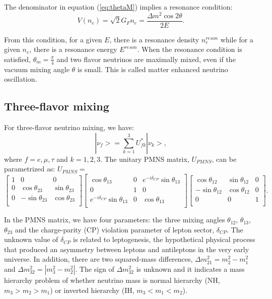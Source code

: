 \documentclass[preprint,12pt]{elsarticle}
\numberwithin{equation}{section}
\begin{document}
The denominator in equation (\ref{eq:thetaM}) implies a resonance condition:
\begin{equation}\label{eq:reson_condition}
V(n_e)=\sqrt 2G_Fn_e=\frac{\Delta m^2\cos2\theta}{2E}.
\end{equation}

From this condition, for a given $E$, there is a resonance density $n^{reson}_e$ while for a given $n_e$, there is a resonance energy $E^{reson}$. When the resonance condition is satisfied, $\theta_m = \frac{\pi}{4}$ and two flavor neutrinos are maximally mixed, even if the vacuum mixing angle $\theta$ is small. This is called matter enhanced neutrino oscillation\cite{smirnov,japan_text}.

\subsection{Three-flavor mixing}
For three-flavor neutrino mixing, we have\cite{pdg2018}:
\begin{equation}\label{eq:mixingmatrix}
|\nu_f> = \sum_{k=1}^3U^*_{fk}|\nu_k>, 
\end{equation}
where $f=e,\mu,\tau$ and $k=1,2,3$. The unitary PMNS matrix, $U_{PMNS}$, can be parametrized as: 
$U_{PMNS} = $
\begin{equation}
\begin{bmatrix}
1 &0 &0\\
0 &\cos\theta_{23} &\sin\theta_{23}\\
0 &-\sin\theta_{23} &\cos\theta_{23}\\ 
\end{bmatrix}
\begin{bmatrix}
\cos\theta_{13} &0 &e^{-i\delta_{CP}}\sin\theta_{13}\\
0 &1 &0\\
e^{-i\delta_{CP}}\sin\theta_{13} &0 &\cos\theta_{13}\\ 
\end{bmatrix}
\begin{bmatrix}
\cos\theta_{12} &\sin\theta_{12} &0\\
-\sin\theta_{12} &\cos\theta_{12} &0\\
0 &0 &1\\ 
\end{bmatrix}.
\end{equation}

In the PMNS matrix, we have four parameters: the three mixing angles $\theta_{12}$, $\theta_{13}$, $\theta_{23}$ and the charge-parity (CP) violation parameter of lepton sector, $\delta_{CP}$. The unknown value of $\delta_{CP}$ is related to leptogenesis, the hypothetical physical process that produced an asymmetry between leptons and antileptons in the very early universe\cite{wiki_cp}. In addition, there are two squared-mass differences, $\Delta m^2_{21}=m_2^2-m_1^2$ and $\Delta m^2_{32}=|m_3^2-m_2^2|$. The sign of $\Delta m^2_{32}$ is unknown and it indicates a mass hierarchy problem of whether neutrino mass is normal hierarchy (NH, $m_3>m_2>m_1$) or inverted hierarchy (IH, $m_3<m_1<m_2$)\cite{pdg2018}. 
\end{document}
